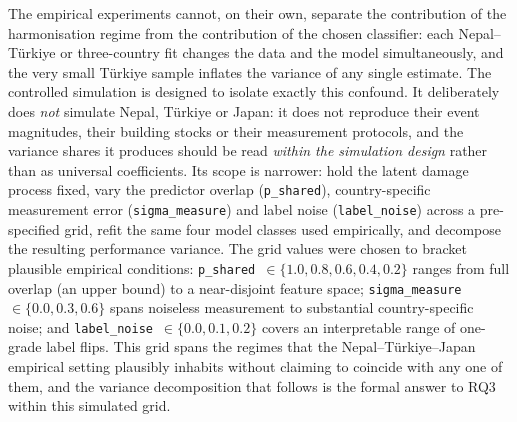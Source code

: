 \documentclass[11pt,a4paper]{article}
\begin{document}
The empirical experiments cannot, on their own, separate the contribution of the harmonisation regime from the contribution of the chosen classifier: each Nepal--T\"urkiye or three-country fit changes the data and the model simultaneously, and the very small T\"urkiye sample inflates the variance of any single estimate. The controlled simulation is designed to isolate exactly this confound. It deliberately does \emph{not} simulate Nepal, T\"urkiye or Japan: it does not reproduce their event magnitudes, their building stocks or their measurement protocols, and the variance shares it produces should be read \emph{within the simulation design} rather than as universal coefficients. Its scope is narrower: hold the latent damage process fixed, vary the predictor overlap (\texttt{p\_shared}), country-specific measurement error (\texttt{sigma\_measure}) and label noise (\texttt{label\_noise}) across a pre-specified grid, refit the same four model classes used empirically, and decompose the resulting performance variance. The grid values were chosen to bracket plausible empirical conditions: \texttt{p\_shared}~$\in\{1.0, 0.8, 0.6, 0.4, 0.2\}$ ranges from full overlap (an upper bound) to a near-disjoint feature space; \texttt{sigma\_measure}~$\in\{0.0, 0.3, 0.6\}$ spans noiseless measurement to substantial country-specific noise; and \texttt{label\_noise}~$\in\{0.0, 0.1, 0.2\}$ covers an interpretable range of one-grade label flips. This grid spans the regimes that the Nepal--T\"urkiye--Japan empirical setting plausibly inhabits without claiming to coincide with any one of them, and the variance decomposition that follows is the formal answer to RQ3 within this simulated grid.
\end{document}
